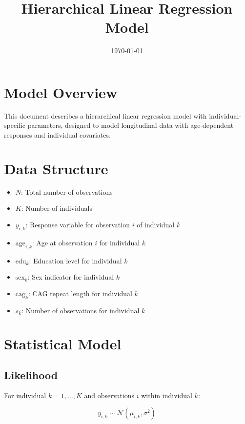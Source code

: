 \documentclass[12pt]{article}
\title{Hierarchical Linear Regression Model}
\author{}
\date{\today}
\begin{document}
\maketitle

\section{Model Overview}

This document describes a hierarchical linear regression model with individual-specific parameters, designed to model longitudinal data with age-dependent responses and individual covariates.

\section{Data Structure}

\begin{itemize}
    \item $N$: Total number of observations
    \item $K$: Number of individuals
    \item $y_{i,k}$: Response variable for observation $i$ of individual $k$
    \item $\text{age}_{i,k}$: Age at observation $i$ for individual $k$
    \item $\text{edu}_k$: Education level for individual $k$
    \item $\text{sex}_k$: Sex indicator for individual $k$
    \item $\text{cag}_k$: CAG repeat length for individual $k$
    \item $s_k$: Number of observations for individual $k$
\end{itemize}

\section{Statistical Model}

\subsection{Likelihood}

For individual $k = 1, \ldots, K$ and observations $i$ within individual $k$:

\begin{equation}
y_{i,k} \sim \mathcal{N}(\mu_{i,k}, \sigma^2)
\end{equation}
\end{document}
